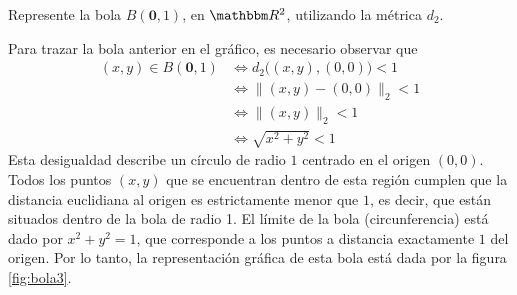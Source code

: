 
\begin{examplebox}{}{}
    Represente la bola $B(\mathbf{0}, 1)$, en $\RR[2]$, utilizando la métrica $d_2$.

    \tcblower
    \solucion Para trazar la bola anterior en el gráfico, es necesario observar que
    \begin{align*}
        (x, y) \in B(\mathbf{0}, 1) & \Longleftrightarrow d_2 \big( (x, y), (0, 0) \big) < 1 \\
        & \Longleftrightarrow \| (x, y) - (0, 0) \|_2 < 1 \\
        & \Longleftrightarrow \| (x, y) \|_2 < 1 \\
        & \Longleftrightarrow \sqrt{x^2 + y^2} < 1
    \end{align*}
    Esta desigualdad describe un círculo de radio $1$ centrado en el origen $(0, 0)$. Todos los puntos $(x, y)$ que se encuentran dentro de esta región cumplen que la distancia euclidiana al origen es estrictamente menor que $1$, es decir, que están situados dentro de la bola de radio 1. El límite de la bola (circunferencia) está dado por $x^2 + y^2 = 1$, que corresponde a los puntos a distancia exactamente $1$ del origen. Por lo tanto, la representación gráfica de esta bola está dada por la figura \ref{fig:bola3}.
\end{examplebox}

\newpage
{}

